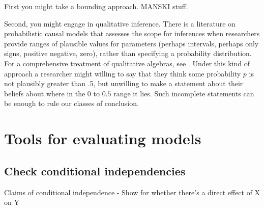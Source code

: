 \documentclass[12pt,]{book}
\newenvironment{Shaded}{\begin{snugshade}}{\end{snugshade}}
\newcommand{\CommentTok}[1]{\textcolor[rgb]{0.56,0.35,0.01}{\textit{#1}}}
\newcommand{\DataTypeTok}[1]{\textcolor[rgb]{0.13,0.29,0.53}{#1}}
\newcommand{\DecValTok}[1]{\textcolor[rgb]{0.00,0.00,0.81}{#1}}
\newcommand{\FloatTok}[1]{\textcolor[rgb]{0.00,0.00,0.81}{#1}}
\newcommand{\KeywordTok}[1]{\textcolor[rgb]{0.13,0.29,0.53}{\textbf{#1}}}
\newcommand{\NormalTok}[1]{#1}
\newcommand{\OperatorTok}[1]{\textcolor[rgb]{0.81,0.36,0.00}{\textbf{#1}}}
\newcommand{\StringTok}[1]{\textcolor[rgb]{0.31,0.60,0.02}{#1}}
\begin{document}
First you might take a bounding approach. MANSKI stuff.

Second, you might engage in qualitative inference. There is a literature on probabilistic causal models that assesses the scope for inferences when researchers provide ranges of plausible values for parameters (perhaps intervals, perhaps only signs, positive negative, zero), rather than specifying a probability distribution. For a comprehensive treatment of qualitative algebras, see \citet{parsons2001qualitative}. Under this kind of approach a researcher might willing to say that they think some probability \(p\) is not plausibly greater than .5, but unwilling to make a statement about their beliefs about where in the \(0\) to \(0.5\) range it lies. Such incomplete statements can be enough to rule our classes of conclusion.

\hypertarget{tools-for-evaluating-models}{%
\section{Tools for evaluating models}\label{tools-for-evaluating-models}}

\hypertarget{check-conditional-independencies}{%
\subsection{Check conditional independencies}\label{check-conditional-independencies}}

Claims of conditional independence - Show for whether there's a direct effect of X on Y

\begin{Shaded}
\end{Shaded}
\end{document}
